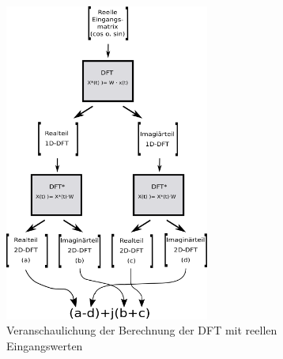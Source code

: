 \begin{figure}[htbp]
 \centering
   \includegraphics[width=0.6\textwidth]{img/reelleMatMult.png}
 \caption{Veranschaulichung der Berechnung der DFT mit reellen Eingangswerten}
 \label{pic:reelleDFT}
\end{figure}



